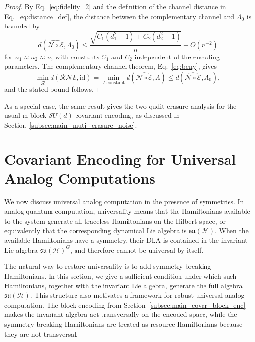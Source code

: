 \documentclass[10pt,twocolumn,superscriptaddress,aps,amsmath,amssymb,citeautoscript,floatfix,prx,longbibliography]{revtex4-2}
\newcounter{alg}
\theoremstyle{plain}
\theoremstyle{plain}
\theoremstyle{plain}
\theoremstyle{plain}
\theoremstyle{plain}
\theoremstyle{plain}
\begin{document}
\begin{proof}
By Eq.~\eqref{eq:fidelity_2} and the definition of the channel distance in Eq.~\eqref{eq:distance_def}, the distance between the complementary channel and $\Lambda_0$ is bounded by
$$
    d\left(\widehat{\mathcal N\circ\mathcal E},\Lambda_0\right)
    \le
    \frac{
        \sqrt{
            C_1(d_1^2-1)
            +
            C_2(d_2^2-1)
        }
    }{n}
    +
    O(n^{-2})
$$
for $n_1\approx n_2\approx n$, with constants $C_1$ and $C_2$ independent of the encoding parameters. The complementary-channel theorem, Eq.~\eqref{eq:beny}, gives
$$
    \min_{\mathcal R}
    d(\mathcal R\mathcal N\mathcal E,\mathrm{id})
    =
    \min_{\Lambda\,\mathrm{constant}}
    d\left(\widehat{\mathcal N\circ\mathcal E},\Lambda\right)
    \le
    d\left(\widehat{\mathcal N\circ\mathcal E},\Lambda_0\right),
$$
and the stated bound follows.
\end{proof}

As a special case, the same result gives the two-qudit erasure analysis for the usual in-block $SU(d)$-covariant encoding, as discussed in Section~\ref{subsec:main_muti_erasure_noise}.

\section{Covariant Encoding for Universal Analog Computations}\label{sec:main_univ_analog}

We now discuss universal analog computation in the presence of symmetries. In analog quantum computation, universality means that the Hamiltonians available to the system generate all traceless Hamiltonians on the Hilbert space, or equivalently that the corresponding dynamical Lie algebra is $\mathfrak{su}(\mathcal H)$. When the available Hamiltonians have a symmetry, their DLA is contained in the invariant Lie algebra $\mathfrak{su}(\mathcal H)^G$, and therefore cannot be universal by itself.

The natural way to restore universality is to add symmetry-breaking Hamiltonians. In this section, we give a sufficient condition under which such Hamiltonians, together with the invariant Lie algebra, generate the full algebra $\mathfrak{su}(\mathcal H)$. This structure also motivates a framework for robust universal analog computation. The block encoding from Section~\ref{subsec:main_covar_block_enc} makes the invariant algebra act transversally on the encoded space, while the symmetry-breaking Hamiltonians are treated as resource Hamiltonians because they are not transversal.
\end{document}
